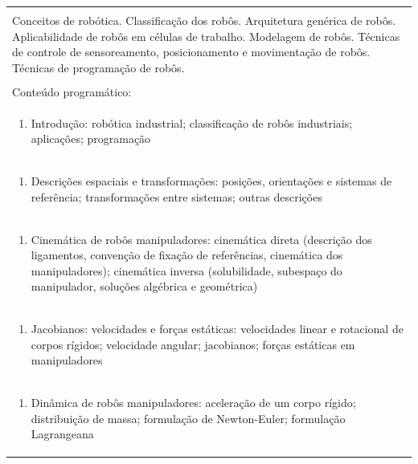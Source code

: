 \documentclass[11pt]{article}
\begin{document}
\begin{center}
\begin{longtable}{|p{4cm}|p{4cm}|p{4cm}|p{4cm}|}
\multicolumn{4}{|p{16cm}|}{}\\
\multicolumn{4}{|p{\dimexpr 16cm + 6\tabcolsep\relax}|}{Conceitos de robótica. Classificação dos robôs. Arquitetura genérica de robôs. Aplicabilidade de robôs em células de trabalho. Modelagem de robôs. Técnicas de controle de sensoreamento, posicionamento e movimentação de robôs. Técnicas de programação de robôs.}\\
\multicolumn{4}{|p{16cm}|}{}\\
\hline
\multicolumn{4}{|p{16cm}|}{Conteúdo programático:}\\*
\multicolumn{4}{|p{\dimexpr 16cm + 6\tabcolsep\relax}|}{\begin{enumerate}[start=1]\item Introdução: robótica industrial; classificação de robôs industriais; aplicações; programação\end{enumerate}}\\
\multicolumn{4}{|p{\dimexpr 16cm + 6\tabcolsep\relax}|}{\begin{enumerate}[start=2]\item Descrições espaciais e transformações: posições, orientações e sistemas de referência; transformações entre sistemas; outras descrições\end{enumerate}}\\
\multicolumn{4}{|p{\dimexpr 16cm + 6\tabcolsep\relax}|}{\begin{enumerate}[start=3]\item Cinemática de robôs manipuladores: cinemática direta (descrição dos ligamentos, convenção de fixação de referências, cinemática dos manipuladores); cinemática inversa (solubilidade, subespaço do manipulador, soluções algébrica e geométrica)\end{enumerate}}\\
\multicolumn{4}{|p{\dimexpr 16cm + 6\tabcolsep\relax}|}{\begin{enumerate}[start=4]\item Jacobianos: velocidades e forças estáticas: velocidades linear e rotacional de corpos rígidos; velocidade angular; jacobianos; forças estáticas em manipuladores\end{enumerate}}\\
\multicolumn{4}{|p{\dimexpr 16cm + 6\tabcolsep\relax}|}{\begin{enumerate}[start=5]\item Dinâmica de robôs manipuladores: aceleração de um corpo rígido; distribuição de massa; formulação de Newton-Euler; formulação Lagrangeana\end{enumerate}}\\

\end{longtable}
\end{center}
\end{document}
